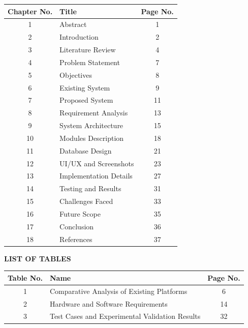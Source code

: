 \documentclass[12pt]{article}
\begin{document}
\begin{center}
\large
\begin{tabular}{|c|p{9cm}|c|}
\hline
\textbf{Chapter No.} & \textbf{Title} & \textbf{Page No.} \\
\hline
1 & Abstract & 1 \\
\hline
2 & Introduction & 2 \\
\hline
3 & Literature Review & 4 \\
\hline
4 & Problem Statement & 7 \\
\hline
5 & Objectives & 8 \\
\hline
6 & Existing System & 9 \\
\hline
7 & Proposed System & 11 \\
\hline
8 & Requirement Analysis & 13 \\
\hline
9 & System Architecture & 15 \\
\hline
10 & Modules Description & 18 \\
\hline
11 & Database Design & 21 \\
\hline
12 & UI/UX and Screenshots & 23 \\
\hline
13 & Implementation Details & 27 \\
\hline
14 & Testing and Results & 31 \\
\hline
15 & Challenges Faced & 33 \\
\hline
16 & Future Scope & 35 \\
\hline
17 & Conclusion & 36 \\
\hline
18 & References & 37 \\
\hline
\end{tabular}
\end{center}

\newpage

\begin{center}
\textbf{\Large LIST OF TABLES}
\end{center}

\vspace{1cm}

\renewcommand{\arraystretch}{1.5}
\begin{center}
\large
\begin{tabular}{|c|p{9cm}|c|}
\hline
\textbf{Table No.} & \textbf{Name} & \textbf{Page No.} \\
\hline
1 & Comparative Analysis of Existing Platforms & 6 \\
\hline
2 & Hardware and Software Requirements & 14 \\
\hline
3 & Test Cases and Experimental Validation Results & 32 \\
\hline
\end{tabular}
\end{center}
\end{document}
